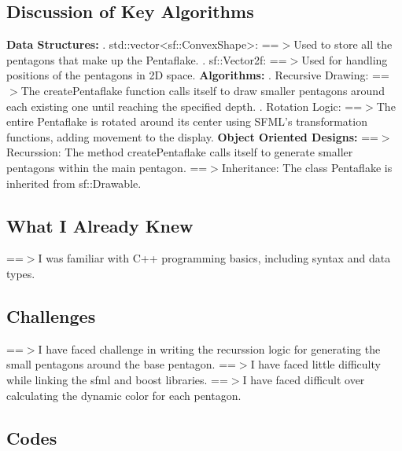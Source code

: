 \documentclass[12pt]{article}
\begin{document}
\subsection{Discussion of Key Algorithms}
\textbf{Data Structures:}
. std::vector<sf::ConvexShape>:
\newline
==$>$Used to store all the pentagons that make up the Pentaflake.
. sf::Vector2f: 
\newline
==$>$Used for handling positions of the pentagons in 2D space.
\newline
\textbf{Algorithms:}
. Recursive Drawing:
\newline
==$>$The createPentaflake function calls itself to draw smaller pentagons around each existing one until reaching the specified depth.
. Rotation Logic:
\newline
==$>$The entire Pentaflake is rotated around its center using SFML's transformation functions, adding movement to the display.
\newline
\textbf{Object Oriented Designs:}
\newline
==$>$Recurssion:
\newline
The method createPentaflake calls itself to generate smaller pentagons within the main pentagon.
\newline
==$>$Inheritance:
\newline
The class Pentaflake is inherited from sf::Drawable.
\subsection{What I Already Knew}
==$>$I was familiar with C++ programming basics, including syntax and data types.
\subsection{Challenges}
==$>$I have faced challenge in writing the recurssion logic for generating the small pentagons around the base pentagon.
\newline
==$>$I have faced little difficulty while linking the sfml and boost libraries.
\newline
==$>$I have faced difficult over calculating the dynamic color for each pentagon.
\subsection{Codes}
\end{document}
